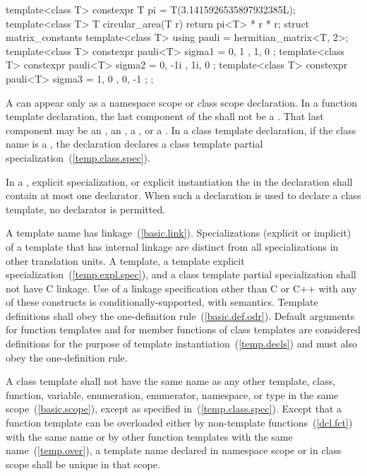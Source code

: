\enterexample
\begin{codeblock}
template<class T>
  constexpr T pi = T(3.1415926535897932385L);
template<class T>
T circular_area(T r) {
  return pi<T> * r * r;
}
struct matrix_constants {
  template<class T>
   using pauli = hermitian_matrix<T, 2>;
  template<class T>
   constexpr pauli<T> sigma1 = { { 0, 1 }, { 1, 0 } };
  template<class T>
   constexpr pauli<T> sigma2 = { { 0, -1i }, { 1i, 0 } };
  template<class T>
   constexpr pauli<T> sigma3 = { { 1, 0 }, { 0, -1 } };
};
\end{codeblock}
\exitexample

\pnum
A
can appear only as a namespace scope or class scope declaration.
In a function template declaration, the last component of the
shall not be a
.
\enternote
That last component may be an , an ,
a , or a . In
a class template declaration, if the
class name
is a
,
the declaration declares a class template partial specialization~(\ref{temp.class.spec}).
\exitnote

\pnum
In a
,
explicit specialization, or explicit instantiation the
in the declaration shall contain at most one declarator.
When such a declaration is used to declare a class template,
no declarator is permitted.

\pnum
{}%
A template name has linkage~(\ref{basic.link}).
Specializations (explicit or implicit) of
a template that has internal linkage are
distinct from all specializations in other translation
units.
A template, a template explicit specialization~(\ref{temp.expl.spec}), and a class
template partial specialization shall not have C linkage. Use of a linkage specification
other than C or C++ with any of these constructs is conditionally-supported, with
 semantics.
Template definitions shall obey the one-definition rule~(\ref{basic.def.odr}).
\enternote
Default arguments for function templates and for member functions of
class templates are considered definitions for the purpose of template
instantiation~(\ref{temp.decls}) and must also obey the one-definition rule.
\exitnote

\pnum
A class template shall not have the same name as any other
template, class, function, variable, enumeration, enumerator, namespace, or
type in the same scope~(\ref{basic.scope}), except as specified in~(\ref{temp.class.spec}).
Except that a function template can be overloaded either by non-template
functions~(\ref{dcl.fct}) with the same name or by other function templates
with the same name~(\ref{temp.over}),
a template name declared in namespace scope or in class scope shall be unique
in that scope.

